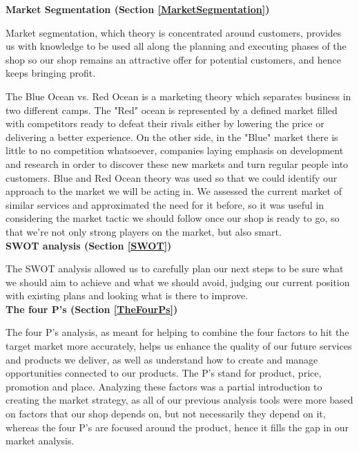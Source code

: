 \documentclass[12p]{article}
\begin{document}
\newpage %
\textbf{Market Segmentation (Section \ref{MarketSegmentation})}

Market segmentation, which theory is concentrated around customers, provides us with knowledge to be used all along the planning and executing phases of the shop so our shop remains an attractive offer for potential customers, and hence keeps bringing profit. 

The Blue Ocean vs. Red Ocean is a marketing theory which separates business in two different camps. The "Red" ocean is represented by a defined market filled with competitors ready to defeat their rivals either by lowering the price or delivering a better experience. On the other side, in the "Blue" market there is little to no competition whatsoever, companies laying emphasis on development and research in order to discover these new markets and turn regular people into customers. Blue and Red Ocean theory was used so that we could identify our approach to the market we will be acting in. We assessed the current market of similar services and approximated the need for it before, so it was useful in considering the market tactic we should follow once our shop is ready to go, so that we’re not only strong players on the market, but also smart. \\

\textbf{SWOT analysis (Section \ref{SWOT})}

The SWOT analysis allowed us to carefully plan our next steps to be sure what we should aim to achieve and what we should avoid, judging our current position with existing plans and looking what is there to improve. \\

\textbf{The four P's (Section \ref{TheFourPs})}

The four P’s analysis, as meant for helping to combine the four factors to hit the target market more accurately, helps us enhance the quality of our future services and products we deliver, as well as understand how to create and manage opportunities connected to our products. The P’s stand for product, price, promotion and place. Analyzing these factors was a partial introduction to creating the market strategy, as all of our previous analysis tools were more based on factors that our shop depends on, but not necessarily they depend on it, whereas the four P’s are focused around the product, hence it fills the gap in our market analysis. \\
\end{document}
